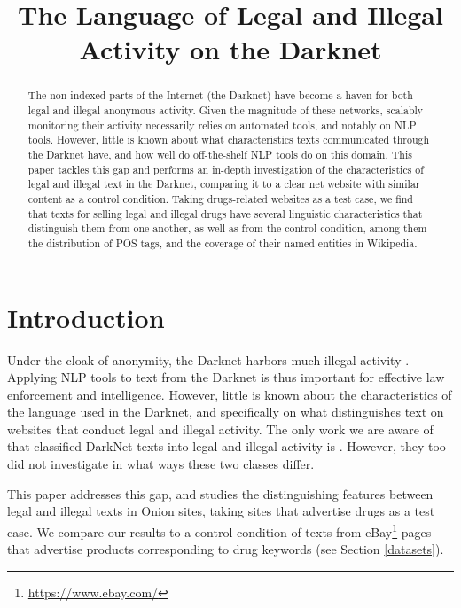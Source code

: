 \documentclass[11pt,a4paper,table]{article}
\title{The Language of Legal and Illegal Activity on the Darknet}
\date{}
\newcommand{\es}[1]{\footnote{\color{purple}ES: #1}}
\begin{document}
\maketitle

\begin{abstract}
  The non-indexed parts of the Internet (the Darknet)
   have become a haven for both legal and illegal anonymous activity.
  Given the magnitude of these networks, scalably monitoring their activity necessarily relies
    on automated tools, and notably on NLP tools.
  However, little is known about what characteristics texts communicated through the Darknet have, 
    and how well do off-the-shelf NLP tools do on this domain.
  This paper tackles this gap and performs an in-depth investigation of the characteristics
    of legal and illegal text in the Darknet, comparing it to a clear net website with similar
    content as a control condition.
  Taking drugs-related websites as a test case, we find that texts for selling legal and illegal drugs
    have several linguistic characteristics that distinguish them from one another, as well as from 
    the control condition, among them the distribution of POS tags, and the coverage of their named entities in Wikipedia.
\end{abstract}



\section{Introduction}
  
  Under the cloak of anonymity, the Darknet harbors much illegal activity \citep{moore2016cryptopolitik}.
  Applying NLP tools to text from the Darknet is thus important for effective law enforcement and intelligence.
  However, little is known about the characteristics of the language used in the Darknet, 
  and specifically on what distinguishes text on websites that conduct legal and illegal activity.
	The only work we are aware of that classified DarkNet texts into legal and illegal activity is \citep{Avarikioti18}.
	However, they too did not investigate in what ways these two classes differ.
  
  
  This paper addresses this gap, and studies the distinguishing features between legal and illegal texts in Onion sites,
  taking sites that advertise drugs as a test case. We compare our results to a control condition of texts 
  from eBay\footnote{\url{https://www.ebay.com/}} pages that 
	advertise products corresponding to drug keywords (see Section \ref{datasets}).
 
\end{document}

